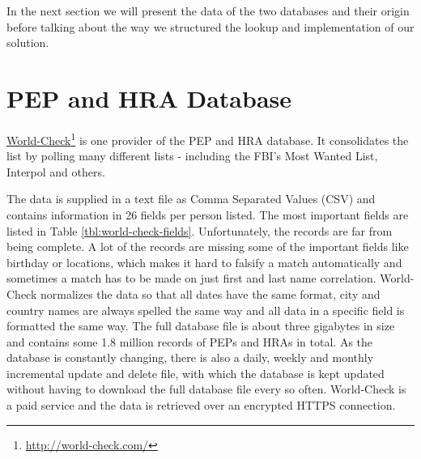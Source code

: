 \documentclass[a4paper, oneside]{csthesis}
\newcommand\fnurl[2]{%
  \href{#2}{#1}\footnote{\url{#2}}%
}
\begin{document}
In the next section we will present the data of the two databases and their origin before talking about the way we structured the lookup and implementation of our solution.


\section{PEP and HRA Database}


\fnurl{World-Check}{http://world-check.com/} is one provider of the PEP and HRA database. It consolidates the list by polling many different lists - including the FBI's Most Wanted List, Interpol and others.

The data is supplied in a text file as Comma Separated Values (CSV) and contains information in 26 fields per person listed. The most important fields are listed in Table \ref{tbl:world-check-fields}. Unfortunately, the records are far from being complete. A lot of the records are missing some of the important fields like birthday or locations, which makes it hard to falsify a match automatically and sometimes a match has to be made on just first and last name correlation. World-Check normalizes the data so that all dates have the same format, city and country names are always spelled the same way and all data in a specific field is formatted the same way.
The full database file is about three gigabytes in size and contains some 1.8 million records of PEPs and HRAs in total. As the database is constantly changing, there is also a daily, weekly and monthly incremental update and delete file, with which the database is kept updated without having to download the full database file every so often.
World-Check is a paid service and the data is retrieved over an encrypted HTTPS connection.
\end{document}
